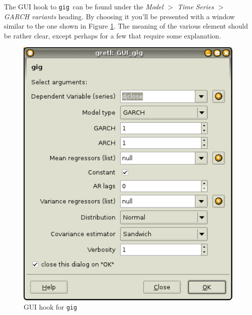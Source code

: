 \documentclass[a4paper,11pt]{article}
\newcommand{\gig}{\texttt{gig}}
\begin{document}
The GUI hook to \gig\ can be found under the \emph{Model $>$ Time
  Series $>$ GARCH variants} heading. By choosing it you'll be
presented with a window similar to the one shown in Figure
\ref{fig:GUI-gig}. The meaning of the various element should be rather
clear, except perhaps for a few that require some explanation.

\begin{figure}[htb]
  \centering
  \includegraphics[scale=0.45]{graphs/GUI-gig}
  \caption{GUI hook for \gig}
  \label{fig:GUI-gig}
\end{figure}
\end{document}
